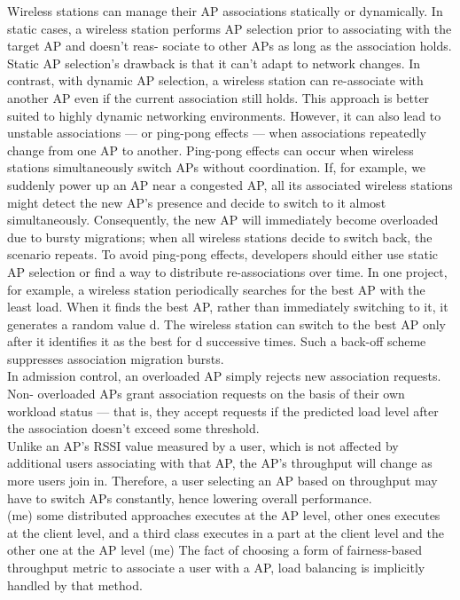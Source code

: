 \documentclass[journal,transmag]{IEEEtran}
\begin{document}
Wireless stations can manage their AP associations statically or dynamically. In static cases, a
wireless station performs AP selection prior to associating with the target AP and doesn’t reas-
sociate to other APs as long as the association holds. Static AP selection’s drawback is that it
can’t adapt to network changes. In contrast, with dynamic AP selection, a wireless station can re-associate with another AP even if the current association still holds. This approach is better suited to highly dynamic networking environments. However, it can also lead to unstable associations — or ping-pong effects — when associations repeatedly change from one AP to another.
Ping-pong effects can occur when wireless stations simultaneously switch APs without coordination. If, for example, we suddenly power up an AP near a congested AP, all its associated wireless stations might detect the new AP’s presence and decide to switch to it almost simultaneously. Consequently, the new AP will immediately become overloaded due to bursty migrations; when all wireless stations decide to switch back, the scenario repeats. To avoid ping-pong effects, developers should either use static AP selection or find a way to distribute re-associations over time. In one project, for example, a wireless station periodically searches for the best AP with the least load. When it finds the best AP, rather than immediately switching to it, it generates a random value d. The wireless station can switch to the best AP only after it identifies it as the best for d successive times. Such a back-off scheme suppresses association migration bursts. \cite{09load_balancing_WLAN} \\
In admission control, an overloaded AP simply rejects new association requests. Non- overloaded APs grant association requests on the basis of their own workload status — that is, they accept requests if the predicted load level after the association doesn’t exceed some threshold. \cite{09load_balancing_WLAN} \\

Unlike an AP’s RSSI value measured by a user, which is not affected by additional users associating with that AP, the AP’s throughput will change as more users join in. Therefore, a user selecting an AP based on throughput may have to switch APs constantly, hence lowering overall performance. \cite{13smartAssoc} \\

(me) some distributed approaches executes at the AP level, other ones executes at the client level, and a third class executes in a part at the client level and the other one at the AP level
(me) The fact of choosing a form of fairness-based throughput metric to associate a user with a AP, load balancing is implicitly handled by that method. \\
\end{document}
